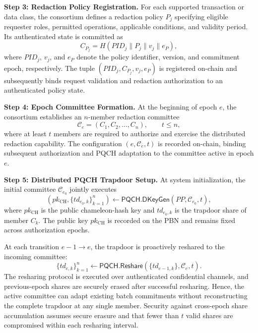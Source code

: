 \documentclass[lettersize,journal]{IEEEtran}
\begin{document}
\textbf{Step 3: Redaction Policy Registration.}
For each supported transaction or data class, the consortium defines a
redaction policy $P_j$ specifying eligible requester roles, permitted
operations, applicable conditions, and validity period. Its authenticated
state is committed as
\begin{equation}
C_{P_j}
=
H(PID_j\parallel P_j\parallel v_j\parallel e_P),
\end{equation}
where $PID_j$, $v_j$, and $e_P$ denote the policy identifier, version,
and commitment epoch, respectively. The tuple
$(PID_j,C_{P_j},v_j,e_P)$ is registered on-chain and subsequently binds
request validation and redaction authorization to an authenticated
policy state.

\textbf{Step 4: Epoch Committee Formation.}
At the beginning of epoch $e$, the consortium establishes an
$n$-member redaction committee
\begin{equation}
\mathcal{C}_e=(C_1,C_2,\ldots,C_n),\qquad t\leq n,
\end{equation}
where at least $t$ members are required to authorize and exercise the
distributed redaction capability. The configuration
$(e,\mathcal{C}_e,t)$ is recorded on-chain, binding subsequent
authorization and PQCH adaptation to the committee active in epoch $e$.

\textbf{Step 5: Distributed PQCH Trapdoor Setup.}
At system initialization, the initial committee
$\mathcal{C}_{e_0}$ jointly executes
\begin{equation}
(pk_{\mathrm{CH}},\{td_{e_0,k}\}_{k=1}^{n})
\leftarrow
\mathsf{PQCH.DKeyGen}(PP,\mathcal{C}_{e_0},t),
\end{equation}
where $pk_{\mathrm{CH}}$ is the public chameleon-hash key and
$td_{e_0,k}$ is the trapdoor share of member $C_k$.
The public key $pk_{\mathrm{CH}}$ is recorded on the PBN and remains
fixed across authorization epochs.

At each transition $e-1\rightarrow e$, the trapdoor is proactively
reshared to the incoming committee:
\begin{equation}
\{td_{e,k}\}_{k=1}^{n}
\leftarrow
\mathsf{PQCH.Reshare}
(\{td_{e-1,k}\},\mathcal{C}_e,t).
\end{equation}
The resharing protocol is executed over authenticated confidential
channels, and previous-epoch shares are securely erased after successful
resharing. Hence, the active committee can adapt existing batch
commitments without reconstructing the complete trapdoor at any single
member. Security against cross-epoch share accumulation assumes secure
erasure and that fewer than $t$ valid shares are compromised within
each resharing interval.
\end{document}
